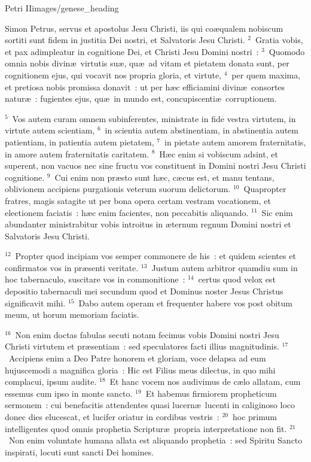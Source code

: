 {Petri II}{images/genese_heading}


\lettrine[lines=10,image=true,loversize=0.05,lraise=-0.03]{S}{}imon Petrus, servus et apostolus Jesu Christi, iis qui co\ae qualem nobiscum sortiti sunt fidem in justitia Dei nostri, et Salvatoris Jesu Christi.
${}^{2}$~Gratia vobis, et pax adimpleatur in cognitione Dei, et Christi Jesu Domini nostri~:
${}^{3}$~Quomodo omnia nobis divin\ae\ virtutis su\ae , qu\ae\ ad vitam et pietatem donata sunt, per cognitionem ejus, qui vocavit nos propria gloria, et virtute,
${}^{4}$~per quem maxima, et pretiosa nobis promissa donavit~: ut per h\ae c efficiamini divin\ae\ consortes natur\ae~: fugientes ejus, qu\ae\ in mundo est, concupiscenti\ae\ corruptionem.


${}^{5}$~Vos autem curam omnem subinferentes, ministrate in fide vestra virtutem, in virtute autem scientiam,
${}^{6}$~in scientia autem abstinentiam, in abstinentia autem patientiam, in patientia autem pietatem,
${}^{7}$~in pietate autem amorem fraternitatis, in amore autem fraternitatis caritatem.
${}^{8}$~H\ae c enim si vobiscum adsint, et superent, non vacuos nec sine fructu vos constituent in Domini nostri Jesu Christi cognitione.
${}^{9}$~Cui enim non pr\ae sto sunt h\ae c, c\ae cus est, et manu tentans, oblivionem accipiens purgationis veterum suorum delictorum.
${}^{10}$~Quapropter fratres, magis satagite ut per bona opera certam vestram vocationem, et electionem faciatis~: h\ae c enim facientes, non peccabitis aliquando.
${}^{11}$~Sic enim abundanter ministrabitur vobis introitus in \ae ternum regnum Domini nostri et Salvatoris Jesu Christi.


${}^{12}$~Propter quod incipiam vos semper commonere de his~: et quidem scientes et confirmatos vos in pr\ae senti veritate.
${}^{13}$~Justum autem arbitror quamdiu sum in hoc tabernaculo, suscitare vos in commonitione~:
${}^{14}$~certus quod velox est depositio tabernaculi mei secundum quod et Dominus noster Jesus Christus significavit mihi.
${}^{15}$~Dabo autem operam et frequenter habere vos post obitum meum, ut horum memoriam faciatis.


${}^{16}$~Non enim doctas fabulas secuti notam fecimus vobis Domini nostri Jesu Christi virtutem et pr\ae sentiam~: sed speculatores facti illius magnitudinis.
${}^{17}$~Accipiens enim a Deo Patre honorem et gloriam, voce delapsa ad eum hujuscemodi a magnifica gloria~: Hic est Filius meus dilectus, in quo mihi complacui, ipsum audite.
${}^{18}$~Et hanc vocem nos audivimus de c\ae lo allatam, cum essemus cum ipso in monte sancto.
${}^{19}$~Et habemus firmiorem propheticum sermonem~: cui benefacitis attendentes quasi lucern\ae\ lucenti in caliginoso loco donec dies elucescat, et lucifer oriatur in cordibus vestris~:
${}^{20}$~hoc primum intelligentes quod omnis prophetia Scriptur\ae\ propria interpretatione non fit.
${}^{21}$~Non enim voluntate humana allata est aliquando prophetia~: sed Spiritu Sancto inspirati, locuti sunt sancti Dei homines.

